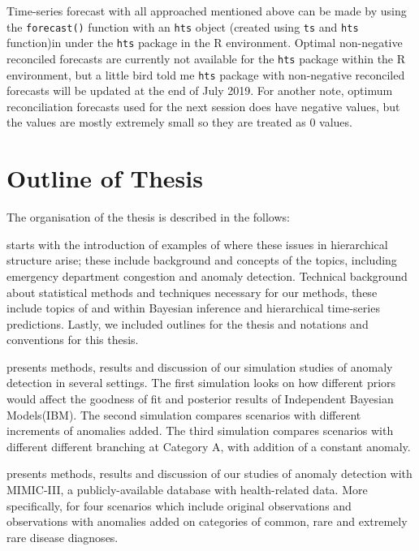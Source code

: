 \newpara

Time-series forecast with all approached mentioned above can be made by using the \texttt{forecast()} function with an \texttt{hts} object (created using \texttt{ts} and \texttt{hts} function)in under the \texttt{hts} package \citep {hts} in the R environment. Optimal non-negative reconciled forecasts are currently not available for the \texttt{hts} package within the R environment, but a little bird told me \texttt{hts} package with non-negative reconciled forecasts will be updated at the end of July 2019. For another note, optimum reconciliation forecasts used for the next session does have negative values, but the values are mostly extremely small so they are treated as 0 values. 



\newpage
\section{Outline of Thesis}

The organisation of the thesis is described in the follows: 

\newpara

 \textbf{} starts with the introduction of examples of where these issues in hierarchical structure arise; these include background and concepts of the topics, including emergency department congestion and anomaly detection. Technical background about statistical methods and techniques necessary for our methods, these include topics of and within Bayesian inference and hierarchical time-series predictions. Lastly, we included outlines for the thesis and notations and conventions for this thesis. 

\newpara

 \textbf{} presents methods, results and discussion of our simulation studies of anomaly detection in several settings. The first simulation looks on how different priors would affect the goodness of fit and posterior results of Independent Bayesian Models(IBM). The second simulation compares scenarios with different increments of anomalies added. The third simulation compares scenarios with different different branching at Category A, with addition of a constant anomaly.

\newpara

 \textbf{} presents methods, results and discussion of our studies of anomaly detection with MIMIC-III, a publicly-available database with health-related data. More specifically, for four scenarios which include original observations and observations with anomalies added on categories of common, rare and extremely rare disease diagnoses. 

